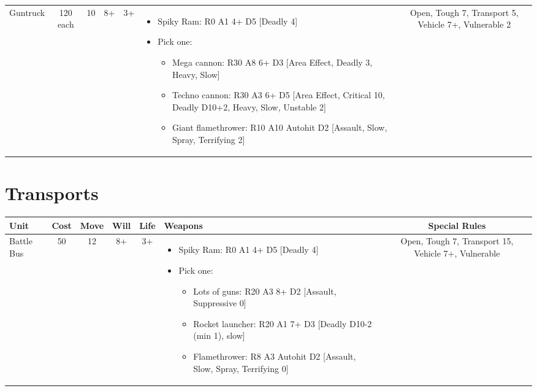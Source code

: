 \documentclass[landscape]{extarticle}
\begin{document}
\begin{small}
\begin{tabular}{UccccWS}
\\


Guntruck
&
120 each
&
10
&
8+
&
3+
&
\begin{itemize}
    \item Spiky Ram: R0 A1 4+ D5 [Deadly 4]
    \item Pick one:
    \begin{itemize}
        \item Mega cannon: R30 A8 6+ D3 [Area Effect, Deadly 3, Heavy, Slow]
        \item Techno cannon: R30 A3 6+ D5 [Area Effect, Critical 10, Deadly D10+2, Heavy, Slow, Unstable 2]
        \item Giant flamethrower: R10 A10 Autohit D2 [Assault, Slow, Spray, Terrifying 2]
    \end{itemize}
\end{itemize}
&
Open, Tough 7, Transport 5, Vehicle 7+, Vulnerable 2
\end{tabular}








\section*{Transports}

\begin{tabular}{UccccWS}

\textbf{Unit} & \textbf{Cost} & \textbf{Move} & \textbf{Will} & \textbf{Life} & \textbf{Weapons} & \textbf{Special Rules} \\


\hline


Battle Bus
&
50
&
12
&
8+
&
3+
&
\begin{itemize}
    \item Spiky Ram: R0 A1 4+ D5 [Deadly 4]
    \item Pick one:
    \begin{itemize}
        \item Lots of guns: R20 A3 8+ D2 [Assault, Suppressive 0]
        \item Rocket launcher: R20 A1 7+ D3 [Deadly D10-2 (min 1), slow]
        \item Flamethrower: R8 A3 Autohit D2 [Assault, Slow, Spray, Terrifying 0]
    \end{itemize}
\end{itemize}
&
Open, Tough 7, Transport 15, Vehicle 7+, Vulnerable
\end{tabular}








\end{small}
\end{document}
